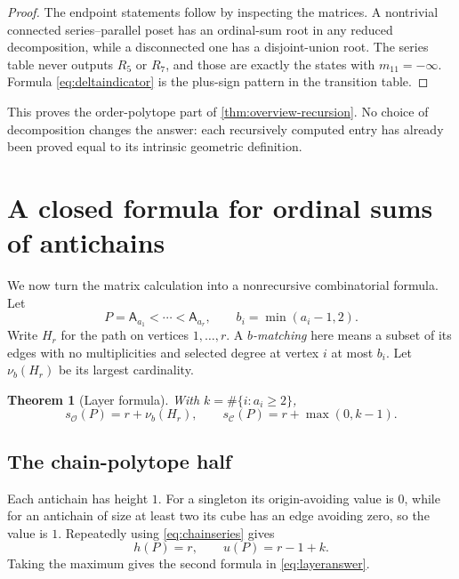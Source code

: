 \documentclass[11pt]{article}
\newtheorem{theorem}{Theorem}[section]
\newtheorem{corollary}[theorem]{Corollary}
\theoremstyle{definition}
\newcommand{\OO}{\mathcal O}
\newcommand{\CC}{\mathcal C}
\newcommand{\sO}{s_{\OO}}
\newcommand{\sC}{s_{\CC}}
\newcommand{\A}[1]{\mathsf A_{#1}}
\begin{document}
\begin{proof}
The endpoint statements follow by inspecting the matrices. A nontrivial connected series--parallel poset has an ordinal-sum root in any reduced decomposition, while a disconnected one has a disjoint-union root. The series table never outputs $R_5$ or $R_7$, and those are exactly the states with $m_{11}=-\infty$. Formula \eqref{eq:deltaindicator} is the plus-sign pattern in the transition table.
\end{proof}

This proves the order-polytope part of \cref{thm:overview-recursion}. No choice of decomposition changes the answer: each recursively computed entry has already been proved equal to its intrinsic geometric definition.

\section{A closed formula for ordinal sums of antichains}\label{sec:layers}

We now turn the matrix calculation into a nonrecursive combinatorial formula. Let
\[
P=\A{a_1}<\cdots<\A{a_r},\qquad b_i=\min(a_i-1,2).
\]
Write $H_r$ for the path on vertices $1,\ldots,r$. A \emph{$b$-matching} here means a subset of its edges with no multiplicities and selected degree at vertex $i$ at most $b_i$. Let $\nu_b(H_r)$ be its largest cardinality.

\begin{theorem}[Layer formula]\label{thm:layers}
With $k=\#\{i:a_i\ge2\}$,
\begin{equation}\label{eq:layeranswer}
\sO(P)=r+\nu_b(H_r),\qquad
\sC(P)=r+\max(0,k-1).
\end{equation}
\end{theorem}

\subsection{The chain-polytope half}
Each antichain has height $1$. For a singleton its origin-avoiding value is $0$, while for an antichain of size at least two its cube has an edge avoiding zero, so the value is $1$. Repeatedly using \eqref{eq:chainseries} gives
\[
h(P)=r,\qquad u(P)=r-1+k.
\]
Taking the maximum gives the second formula in \eqref{eq:layeranswer}.
\end{document}
